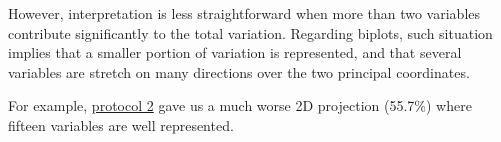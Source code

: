 \documentclass[12pt,]{book}
\newenvironment{Shaded}{\begin{snugshade}}{\end{snugshade}}
\newcommand{\CommentTok}[1]{\textcolor[rgb]{0.56,0.35,0.01}{\textit{#1}}}
\newcommand{\DataTypeTok}[1]{\textcolor[rgb]{0.13,0.29,0.53}{#1}}
\newcommand{\DecValTok}[1]{\textcolor[rgb]{0.00,0.00,0.81}{#1}}
\newcommand{\FloatTok}[1]{\textcolor[rgb]{0.00,0.00,0.81}{#1}}
\newcommand{\KeywordTok}[1]{\textcolor[rgb]{0.13,0.29,0.53}{\textbf{#1}}}
\newcommand{\NormalTok}[1]{#1}
\newcommand{\OperatorTok}[1]{\textcolor[rgb]{0.81,0.36,0.00}{\textbf{#1}}}
\newcommand{\StringTok}[1]{\textcolor[rgb]{0.31,0.60,0.02}{#1}}
\begin{document}
\pagebreak

However, interpretation is less straightforward when more than two variables contribute significantly to the total variation. Regarding biplots, such situation implies that a smaller portion of variation is represented, and that several variables are stretch on many directions over the two principal coordinates.

For example, \protect\hyperlink{prot2}{protocol 2} gave us a much worse 2D projection (55.7\%) where fifteen variables are well represented.

\begin{Shaded}
\end{Shaded}

\pagebreak
\end{document}
